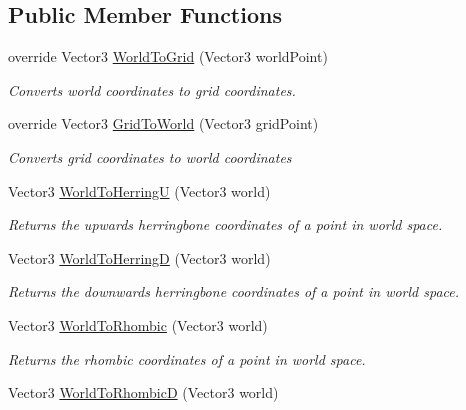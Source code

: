 \subsection*{Public Member Functions}
\begin{DoxyCompactItemize}
\item 
override Vector3 \hyperlink{class_g_f_hex_grid_a476548c7582c1529de47f31ce891f4fd_a476548c7582c1529de47f31ce891f4fd}{World\+To\+Grid} (Vector3 world\+Point)
\begin{DoxyCompactList}\small\item\em Converts world coordinates to grid coordinates.\end{DoxyCompactList}\item 
override Vector3 \hyperlink{class_g_f_hex_grid_abac4ca6dba9e7ee8ed87f70cf4a7afc7_abac4ca6dba9e7ee8ed87f70cf4a7afc7}{Grid\+To\+World} (Vector3 grid\+Point)
\begin{DoxyCompactList}\small\item\em Converts grid coordinates to world coordinates\end{DoxyCompactList}\item 
Vector3 \hyperlink{class_g_f_hex_grid_aa824605cf4179ec0c45eb030496ec3fb_aa824605cf4179ec0c45eb030496ec3fb}{World\+To\+Herring\+U} (Vector3 world)
\begin{DoxyCompactList}\small\item\em Returns the upwards herringbone coordinates of a point in world space.\end{DoxyCompactList}\item 
Vector3 \hyperlink{class_g_f_hex_grid_a40d8289d887c12c1fd95b3ec818ed22a_a40d8289d887c12c1fd95b3ec818ed22a}{World\+To\+Herring\+D} (Vector3 world)
\begin{DoxyCompactList}\small\item\em Returns the downwards herringbone coordinates of a point in world space.\end{DoxyCompactList}\item 
Vector3 \hyperlink{class_g_f_hex_grid_a1669b77f20e1406b7d7554d45635945e_a1669b77f20e1406b7d7554d45635945e}{World\+To\+Rhombic} (Vector3 world)
\begin{DoxyCompactList}\small\item\em Returns the rhombic coordinates of a point in world space.\end{DoxyCompactList}\item 
Vector3 \hyperlink{class_g_f_hex_grid_a72549876d8ef493279002dc04ecc2332_a72549876d8ef493279002dc04ecc2332}{World\+To\+Rhombic\+D} (Vector3 world)

\end{DoxyCompactItemize}

